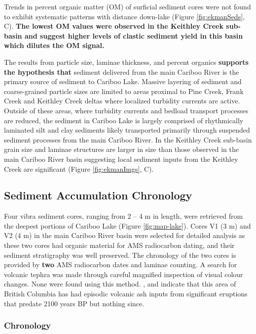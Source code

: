 \documentclass[Royal,times,doublespace,sageh]{sagej}
\begin{document}
Trends in percent organic matter (OM) of surficial sediment cores were
not found to exhibit systematic patterns with distance down-lake (Figure
\ref{fig:ekmanSeds}, C). \textbf{The lowest OM values were observed in
the Keithley Creek sub-basin and suggest higher levels of clastic
sediment yield in this basin which dilutes the OM signal.}

The results from particle size, laminae thickness, and percent organics
\textbf{supports the hypothesis that} sediment delivered from the main
Cariboo River is the primary source of sediment to Cariboo Lake. Massive
layering of sediment and coarse-grained particle sizes are limited to
areas proximal to Pine Creek, Frank Creek and Keithley Creek deltas
where localized turbidity currents are active. Outside of these areas,
where turbidity currents and bedload transport processes are reduced,
the sediment in Cariboo Lake is largely comprised of rhythmically
laminated silt and clay sediments likely transported primarily through
suspended sediment processes from the main Cariboo River. In the
Keithley Creek sub-basin grain size and laminae structures are larger in
size than those observed in the main Cariboo River basin suggesting
local sediment inputs from the Keithley Creek are significant (Figure
\ref{fig:ekmanImgs}, C).

\hypertarget{sediment-accumulation-chronology}{%
\subsection{Sediment Accumulation
Chronology}\label{sediment-accumulation-chronology}}

Four vibra sediment cores, ranging from 2 -- 4 m in length, were
retrieved from the deepest portions of Cariboo Lake (Figure
\ref{fig:map-lake}). Cores V1 (3 m) and V2 (4 m) in the main Cariboo
River basin were selected for detailed analysis as these two cores had
organic material for AMS radiocarbon dating, and their sediment
stratigraphy was well preserved. The chronology of the two cores is
provided by \textbf{two} AMS radiocarbon dates and laminae counting. A
search for volcanic tephra was made through careful magnified inspection
of visual colour changes. None were found using this method.
\citet{Westgate1977}, \citet{Hallett1997} and \citet{Maurer2012b}
indicate that this area of British Columbia has had episodic volcanic
ash inputs from significant eruptions that predate 2100 years BP but
nothing since.

\hypertarget{chronology}{%
\subsubsection{Chronology}\label{chronology}}
\end{document}
